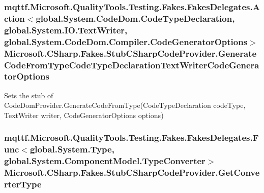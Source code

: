 \hypertarget{class_microsoft_1_1_c_sharp_1_1_fakes_1_1_stub_c_sharp_code_provider_a42194dc51680573f4482cc08cd33b042}{
\subsubsection[{Generate\-Code\-From\-Type\-Code\-Type\-Declaration\-Text\-Writer\-Code\-Generator\-Options}]{\setlength{\rightskip}{0pt plus 5cm}mqttf.\-Microsoft.\-Quality\-Tools.\-Testing.\-Fakes.\-Fakes\-Delegates.\-Action$<$global.\-System.\-Code\-Dom.\-Code\-Type\-Declaration, global.\-System.\-I\-O.\-Text\-Writer, global.\-System.\-Code\-Dom.\-Compiler.\-Code\-Generator\-Options$>$ Microsoft.\-C\-Sharp.\-Fakes.\-Stub\-C\-Sharp\-Code\-Provider.\-Generate\-Code\-From\-Type\-Code\-Type\-Declaration\-Text\-Writer\-Code\-Generator\-Options}}\label{class_microsoft_1_1_c_sharp_1_1_fakes_1_1_stub_c_sharp_code_provider_a42194dc51680573f4482cc08cd33b042}


Sets the stub of Code\-Dom\-Provider.\-Generate\-Code\-From\-Type(\-Code\-Type\-Declaration code\-Type, Text\-Writer writer, Code\-Generator\-Options options)

\hypertarget{class_microsoft_1_1_c_sharp_1_1_fakes_1_1_stub_c_sharp_code_provider_ad5656e55bd86a2efa0b2a56869ad7a03}{
\subsubsection[{Get\-Converter\-Type}]{\setlength{\rightskip}{0pt plus 5cm}mqttf.\-Microsoft.\-Quality\-Tools.\-Testing.\-Fakes.\-Fakes\-Delegates.\-Func$<$global.\-System.\-Type, global.\-System.\-Component\-Model.\-Type\-Converter$>$ Microsoft.\-C\-Sharp.\-Fakes.\-Stub\-C\-Sharp\-Code\-Provider.\-Get\-Converter\-Type}}\label{class_microsoft_1_1_c_sharp_1_1_fakes_1_1_stub_c_sharp_code_provider_ad5656e55bd86a2efa0b2a56869ad7a03}


